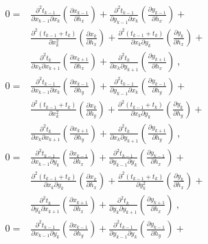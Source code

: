 \begin{align}
\label{eq:fermat3d2der}
0 = & \frac{\partial^2 t_{k-1}}{\partial x_{k-1} \partial x_k} \left( \frac{\partial x_{k-1}}{\partial h_x}\right) + \frac{\partial^2 t_{k-1}}{\partial y_{k-1} \partial x_k} \left( \frac{\partial y_{k-1}}{\partial h_x}\right) +\\ \nonumber
    & \frac{\partial^2 (t_{k-1} + t_k)}{\partial x_k^2} \left( \frac{\partial x_k}{\partial h_x}\right) + \frac{\partial^2 (t_{k-1} + t_k)}{\partial x_k \partial y_k} \left( \frac{\partial y_k}{\partial h_x}\right) + \\ \nonumber
    & \frac{\partial^2 t_k}{\partial x_k \partial x_{k+1}}\left( \frac{\partial x_{k+1}}{\partial h_x}\right)+ \frac{\partial^2 t_k}{\partial x_k \partial y_{k+1}}\left( \frac{\partial y_{k+1}}{\partial h_x}\right)~,\\ \nonumber
0 = & \frac{\partial^2 t_{k-1}}{\partial x_{k-1} \partial x_k} \left( \frac{\partial x_{k-1}}{\partial h_y}\right) + \frac{\partial^2 t_{k-1}}{\partial y_{k-1} \partial x_k} \left( \frac{\partial y_{k-1}}{\partial h_y}\right) +\\ \nonumber
    & \frac{\partial^2 (t_{k-1} + t_k)}{\partial x_k^2} \left( \frac{\partial x_k}{\partial h_y}\right) + \frac{\partial^2 (t_{k-1} + t_k)}{\partial x_k \partial y_k} \left( \frac{\partial y_k}{\partial h_y}\right) + \\ \nonumber
    & \frac{\partial^2 t_k}{\partial x_k \partial x_{k+1}}\left( \frac{\partial x_{k+1}}{\partial h_y}\right)+ \frac{\partial^2 t_k}{\partial x_k \partial y_{k+1}}\left( \frac{\partial y_{k+1}}{\partial h_y}\right)~,\\ \nonumber
0 = & \frac{\partial^2 t_{k-1}}{\partial x_{k-1} \partial y_k} \left( \frac{\partial x_{k-1}}{\partial h_x}\right) + \frac{\partial^2 t_{k-1}}{\partial y_{k-1} \partial y_k} \left( \frac{\partial y_{k-1}}{\partial h_x}\right) +\\ \nonumber
    & \frac{\partial^2 (t_{k-1} + t_k)}{\partial x_k \partial y_k} \left( \frac{\partial x_k}{\partial h_x}\right) + \frac{\partial^2 (t_{k-1} + t_k)}{\partial y_k^2} \left( \frac{\partial y_k}{\partial h_x}\right) + \\ \nonumber
    & \frac{\partial^2 t_k}{\partial y_k \partial x_{k+1}}\left( \frac{\partial x_{k+1}}{\partial h_x}\right)+ \frac{\partial^2 t_k}{\partial y_k \partial y_{k+1}}\left( \frac{\partial y_{k+1}}{\partial h_x}\right)~,\\ \nonumber
0 = & \frac{\partial^2 t_{k-1}}{\partial x_{k-1} \partial y_k} \left( \frac{\partial x_{k-1}}{\partial h_y}\right) + \frac{\partial^2 t_{k-1}}{\partial y_{k-1} \partial y_k} \left( \frac{\partial y_{k-1}}{\partial h_y}\right) +\\ \nonumber

\end{align}
